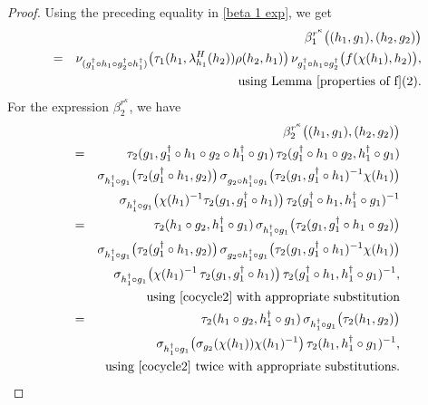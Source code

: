 \documentclass{jonasart}
\theoremstyle{plain}
\begin{document}
\begin{proof}
		Using the preceding equality in \eqref{beta 1 exp}, we get
		\begin{eqnarray}\label{final beta 1 exp}
			&& \beta^{r^\kappa}_1 \big((h_1,g_1),(h_2,g_2) \big)\nonumber\\
			&=& \nu_{(g_1^\dagger\circ h_1\circ g_2^\dagger\circ h_1^\dagger)} \big(\tau_1(h_1,\lambda^H_{ h_1}(h_2))\rho(h_2,h_1)\big) \, \nu_{g_1^{\dagger}\circ h_1 \circ g_2^{\dagger}} \big(f(\chi(h_1),h_2)\big),\label{beta 1 final exp}\\
			&&\text{using Lemma \eqref{properties of f}(2).}\nonumber
		\end{eqnarray}
		For the expression $\beta^{r^\kappa}_2$, we have
		\begin{eqnarray}
			&&\beta^{r^\kappa}_2 \big((h_1,g_1),(h_2,g_2) \big)\nonumber\\
			&=&\tau_2(g_1,g_1^\dagger\circ h_1\circ g_2\circ h_1^\dagger\circ g_1) \, \tau_2(g_1^\dagger\circ h_1\circ g_2,h_1^\dagger\circ g_1)\nonumber\\
			&&\sigma_{h_1^\dagger\circ g_1} \big(\tau_2(g_1^\dagger\circ h_1,g_2)\big) \, \sigma_{g_2\circ h_1^{\dagger}\circ g_1}\big(\tau_2(g_1,g_1^\dagger\circ h_1)^{-1}\chi(h_1)\big)\nonumber\\
			&&\sigma_{h_1^{\dagger}\circ g_1}\big(\chi(h_1)^{-1}\tau_2(g_1,g_1^\dagger\circ h_1) \big) \, \tau_2(g_1^\dagger\circ h_1,h_1^\dagger\circ g_1)^{-1}\nonumber\\
			&=&\tau_2(h_1\circ g_2, h_1^{\dagger}\circ g_1)\, \sigma_{h_1^{\dagger}\circ g_1} \big(\tau_2(g_1,g_1^{\dagger}\circ h_1\circ g_2)\big)\nonumber\\
			&&\sigma_{h_1^\dagger\circ g_1} \big(\tau_2(g_1^\dagger\circ h_1,g_2)\big)\, \sigma_{g_2\circ h_1^{\dagger}\circ g_1}\big(\tau_2(g_1,g_1^\dagger\circ h_1)^{-1}\chi(h_1)\big)\nonumber\\
			&&\sigma_{h_1^{\dagger}\circ g_1}\big(\chi(h_1)^{-1}\, \tau_2(g_1,g_1^\dagger\circ h_1) \big)\, \tau_2(g_1^\dagger\circ h_1,h_1^\dagger\circ g_1)^{-1},\nonumber\\
			&&\text{using \eqref{cocycle2} with appropriate substitution}\nonumber\\
			&=&\tau_2(h_1\circ g_2, h_1^{\dagger}\circ g_1)\, \sigma_{h_1^{\dagger}\circ g_1} \big(\tau_2(h_1,g_2)\big)\nonumber\\
			&&\sigma_{h_1^{\dagger}\circ g_1} \big(\sigma_{g_2}(\chi(h_1))\chi(h_1)^{-1}\big)\, \tau_2(h_1,h_1^{\dagger}\circ g_1)^{-1},\label{beta 2 final exp}\\
			&&\text{using \eqref{cocycle2} twice with appropriate substitutions}.\nonumber

\end{eqnarray}
\end{proof}
\end{document}
